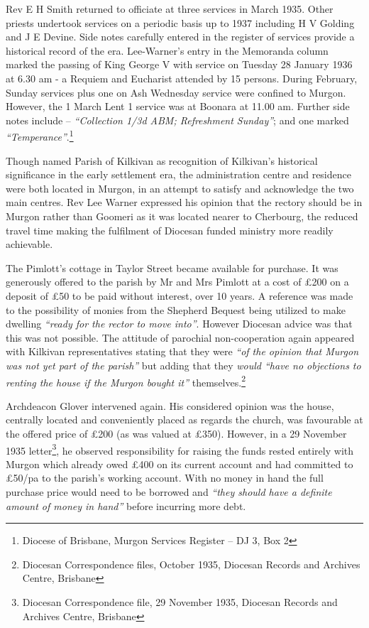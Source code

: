 Rev E H Smith returned to officiate at three services in March 1935. Other priests undertook services on a periodic basis up to 1937 including H V Golding and J E Devine. Side notes carefully entered in the register of services provide a historical record of the era. Lee-Warner's entry in the Memoranda column marked the passing of King George V with service on Tuesday 28 January 1936 at 6.30 am - a Requiem and Eucharist attended by 15 persons. During February, Sunday services plus one on Ash Wednesday service were confined to Murgon. However, the 1 March Lent 1 service was at Boonara at 11.00 am. Further side notes include -- \emph{``Collection 1/3d ABM; Refreshment Sunday''}; and one marked \emph{``Temperance''}.\footnote{Diocese of Brisbane, Murgon Services Register -- DJ 3, Box 2}

Though named Parish of Kilkivan as recognition of Kilkivan's historical significance in the early settlement era, the administration centre and residence were both located in Murgon, in an attempt to satisfy and acknowledge the two main centres. Rev Lee Warner expressed his opinion that the rectory should be in Murgon rather than Goomeri as it was located nearer to Cherbourg, the reduced travel time making the fulfilment of Diocesan funded ministry more readily achievable.

The Pimlott's cottage in Taylor Street became available for purchase. It was generously offered to the parish by Mr and Mrs Pimlott at a cost of £200 on a deposit of £50 to be paid without interest, over 10 years. A reference was made to the possibility of monies from the Shepherd Bequest being utilized to make dwelling \emph{``ready for the rector to move into''}. However Diocesan advice was that this was not possible. The attitude of parochial non-cooperation again appeared with Kilkivan representatives stating that they were \emph{``of the opinion that Murgon was not yet part of the parish''} but adding that they \emph{would ``have no objections to renting the house if the Murgon bought it''} themselves.\footnote{Diocesan Correspondence files, October 1935, Diocesan Records and Archives Centre, Brisbane}

Archdeacon Glover intervened again. His considered opinion was the house, centrally located and conveniently placed as regards the church, was favourable at the offered price of £200 (as was valued at £350). However, in a 29 November 1935 letter\footnote{Diocesan Correspondence file, 29 November 1935, Diocesan Records and Archives Centre, Brisbane}, he observed responsibility for raising the funds rested entirely with Murgon which already owed £400 on its current account and had committed to £50/pa to the parish's working account. With no money in hand the full purchase price would need to be borrowed and \emph{``they should have a definite amount of money in hand''} before incurring more debt.

